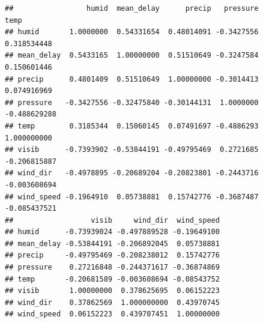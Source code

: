 \documentclass[]{book}
\newenvironment{Shaded}{\begin{snugshade}}{\end{snugshade}}
\newcommand{\DataTypeTok}[1]{\textcolor[rgb]{0.13,0.29,0.53}{#1}}
\newcommand{\KeywordTok}[1]{\textcolor[rgb]{0.13,0.29,0.53}{\textbf{#1}}}
\newcommand{\NormalTok}[1]{#1}
\newcommand{\OperatorTok}[1]{\textcolor[rgb]{0.81,0.36,0.00}{\textbf{#1}}}
\newcommand{\StringTok}[1]{\textcolor[rgb]{0.31,0.60,0.02}{#1}}
\theoremstyle{definition}
\theoremstyle{definition}
\theoremstyle{definition}
\theoremstyle{remark}
\begin{document}
\begin{Shaded}
\end{Shaded}

\begin{verbatim}
##                 humid  mean_delay      precip   pressure         temp
## humid       1.0000000  0.54331654  0.48014091 -0.3427556  0.318534448
## mean_delay  0.5433165  1.00000000  0.51510649 -0.3247584  0.150601446
## precip      0.4801409  0.51510649  1.00000000 -0.3014413  0.074916969
## pressure   -0.3427556 -0.32475840 -0.30144131  1.0000000 -0.488629288
## temp        0.3185344  0.15060145  0.07491697 -0.4886293  1.000000000
## visib      -0.7393902 -0.53844191 -0.49795469  0.2721685 -0.206815887
## wind_dir   -0.4978895 -0.20689204 -0.20823801 -0.2443716 -0.003608694
## wind_speed -0.1964910  0.05738881  0.15742776 -0.3687487 -0.085437521
##                  visib     wind_dir  wind_speed
## humid      -0.73939024 -0.497889528 -0.19649100
## mean_delay -0.53844191 -0.206892045  0.05738881
## precip     -0.49795469 -0.208238012  0.15742776
## pressure    0.27216848 -0.244371617 -0.36874869
## temp       -0.20681589 -0.003608694 -0.08543752
## visib       1.00000000  0.378625695  0.06152223
## wind_dir    0.37862569  1.000000000  0.43970745
## wind_speed  0.06152223  0.439707451  1.00000000
\end{verbatim}
\end{document}
